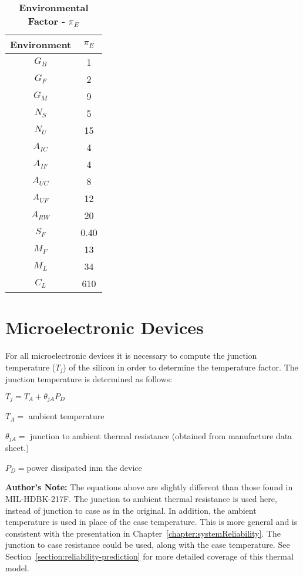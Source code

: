 \begin{table}[h]
\caption{\textbf{Environmental Factor -} $\pi_{E}$}
\label{table:capacitanceEnvironmentalFactor}
\begin{tabular}{|c|c|} \hline
\rowcolor{Gray}
\textbf{Environment} & $\pi_{E}$ \\ \hline
$G_{B}$ & 1 \\ \hline
$G_{F}$ & 2 \\ \hline
$G_{M}$ & 9 \\ \hline
$N_{S}$ & 5 \\ \hline
$N_{U}$ & 15 \\ \hline
$A_{IC}$ & 4 \\ \hline
$A_{IF}$ & 4 \\ \hline
$A_{UC}$ & 8 \\ \hline
$A_{UF}$ & 12 \\ \hline
$A_{RW}$ & 20 \\ \hline
$S_{F}$ & 0.40 \\ \hline
$M_{F}$ & 13 \\ \hline
$M_{L}$ & 34 \\ \hline
$C_{L}$ & 610 \\ \hline
\end{tabular}
\end{table}

\newpage

\section{Microelectronic Devices}
\label{section:microelectronic-devices}

For all microelectronic devices it is necessary to compute the junction
temperature ($T_{j}$) of the silicon in order to determine the temperature 
factor. The junction temperature is determined as follows:

\begin{description}
\item $T_{j} = T_{A} +  \theta_{jA} P_{D}$
\item $T_A = $ ambient temperature
\item $\theta_{jA} = $ junction to ambient thermal resistance (obtained from manufacture data sheet.)
\item $P_{D} = $power dissipated inm the device
\end{description}

\textbf{Author's Note:} The equations above are slightly different than
those found in MIL-HDBK-217F. The junction to ambient thermal resistance
is used here, instead of junction to case as in the original. In
addition, the ambient temperature is used in place of the case
temperature. This is more general and is consistent with the
presentation in Chapter~\ref{chapter:systemReliability}. The junction to case 
resistance could be used, along with the case temperature. See 
Section~\ref{section:reliability-prediction} for more detailed
coverage of this thermal model.

